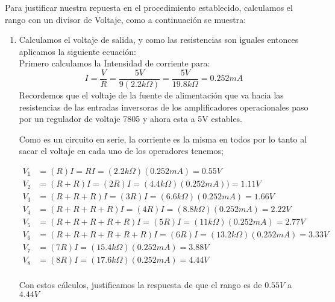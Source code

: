 \documentclass[12pt]{article}
\begin{document}
		Para justificar nuestra repuesta en el procedimiento establecido, calculamos el rango con un divisor de Voltaje, como a continuación se muestra:
		
		\begin{enumerate}
		    \item Calculamos el voltaje de salida, y como las resistencias son iguales entonces aplicamos la siguiente ecuación:\\
		    Primero calculamos la Intensidad de corriente para:
		     $$
		        I = \frac{V}{R} = \frac{5V}{9(2.2k\Omega)} = \frac{5V}{19.8k\Omega} = 0.252 mA 
		     $$
		     Recordemos que el voltaje de la fuente de alimentación que va hacia las resistencias de las entradas inversoras de los amplificadores operacionales paso por un regulador de voltaje 7805 y ahora esta a 5V estables.
		     
		     Como es un circuito en serie, la corriente es la misma en todos por lo tanto al sacar el voltaje en cada uno de los operadores tenemos;
		   
		    \begin{equation*}
		        \begin{split}

		             V_{1} &= (R)I = RI = (2.2k\Omega)(0.252mA) = 0.55 V   \\
		            V_{2} &= (R+R)I = (2R)I = (4.4k\Omega)(0.252mA)) = 1.11 V     \\
		            V_{3} &= (R+R+R)I = (3R)I = (6.6k\Omega)(0.252mA) = 1.66 V     \\
		            V_{4} &= (R+R+R+R)I = (4R)I = (8.8k\Omega)(0.252mA) = 2.22 V     \\
		            V_{5} &= (R+R+R+R+R)I = (5R)I = (11k\Omega)(0.252mA) = 2.77 V     \\
		            V_{6} &= (R+R+R+R+R+R)I = (6R)I = (13.2k\Omega)(0.252mA) = 3.33 V     \\
		            V_{7} &= (7R)I = (15.4k\Omega)(0.252mA) = 3.88 V     \\
		            V_{8} &= (8R)I =  (17.6k\Omega)(0.252mA) = 4.44 V     \\

		        \end{split}
		    \end{equation*}
		    
		    Con estos cálculos, justificamos la respuesta de que el rango es de $0.55 V$ a $4.44 V$
		    
		\end{enumerate}


	\nocite{ref1, ref2, ref3, ref4, ref5, ref6, ref7}
	
        

	
\end{document}
